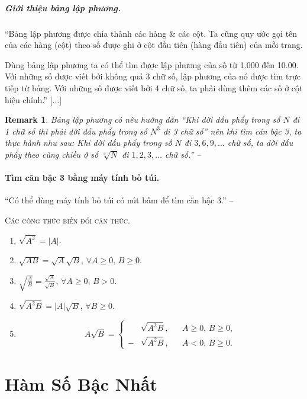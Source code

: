 \documentclass{article}
\numberwithin{equation}{section}
\newtheorem{remark}{Remark}[section]
\begin{document}
\subparagraph{Giới thiệu bảng lập phương.} ``Bảng lập phương được chia thành các hàng \& các cột. Ta cũng quy ước gọi tên của các hàng (cột) theo số được ghi ở cột đầu tiên (hàng đầu tiên) của mỗi trang.

Dùng bảng lập phương ta có thể tìm được lập phương của số từ 1.000 đến 10.00. Với những số được viết bởi không quá 3 chữ số, lập phương của nó được tìm trực tiếp từ bảng. Với những số được viết bởi 4 chữ số, ta phải dùng thêm các số ở cột hiệu chính.'' [$\ldots$]

\begin{remark}
	Bảng lập phương có nêu hướng dẫn ``Khi dời dấu phẩy trong số $N$ đi 1 chữ số thì phải dời dấu phẩy trong số $N^3$ đi 3 chữ số'' nên khi tìm căn bậc 3, ta thực hành như sau: Khi dời dấu phẩy trong số $N$ đi $3,6,9,\ldots$ chữ số, ta dời dấu phẩy theo cùng chiều ở số $\sqrt[3]{N}$ đi $1,2,3,\ldots$ chữ số.'' -- \cite[pp. 36--38]{SGK_Toan_9_tap_1}
\end{remark}

\paragraph{Tìm căn bậc 3 bằng máy tính bỏ túi.} ``Có thể dùng máy tính bỏ túi có nút bấm \fbox{$\sqrt[3]{\ }$} để tìm căn bậc 3.'' -- \cite[p. 38]{SGK_Toan_9_tap_1}

\textsc{Các công thức biến đổi căn thức.}
\begin{enumerate}
	\item $\sqrt{A^2} = |A|$.
	\item $\sqrt{AB} = \sqrt{A}\sqrt{B}$, $\forall A\ge 0,\,B\ge 0$.
	\item $\sqrt{\frac{A}{B}} = \frac{\sqrt{A}}{\sqrt{B}}$, $\forall A\ge 0,\,B > 0$.
	\item $\sqrt{A^2B} = |A|\sqrt{B}$, $\forall B\ge 0$.
	\item \begin{equation*}
		A\sqrt{B} = \left\{\begin{split}
			&\sqrt{A^2B},&&A\ge 0,\,B\ge 0,\\
			-&\sqrt{A^2B},&&A < 0,\,B\ge 0.
		\end{split}\right.
	\end{equation*}
\end{enumerate}

\section{Hàm Số Bậc Nhất}
\end{document}
